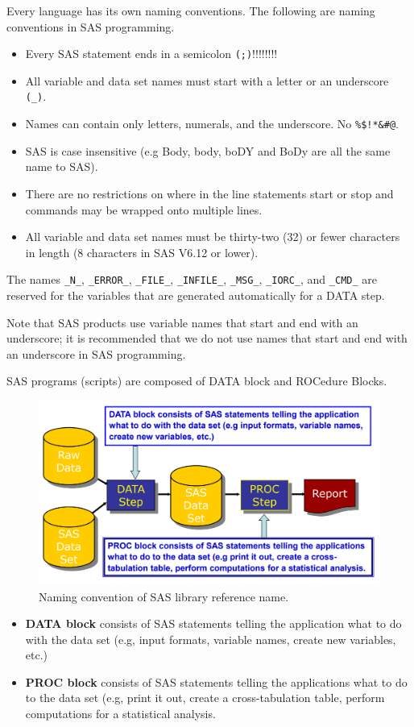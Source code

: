 \documentclass[
]{book}
\providecommand{\tightlist}{%
  \setlength{\itemsep}{0pt}\setlength{\parskip}{0pt}}
\begin{document}
Every language has its own naming conventions. The following are naming conventions in SAS programming.

\begin{itemize}
\tightlist
\item
  Every SAS statement ends in a semicolon \texttt{(;)}!!!!!!!!
\item
  All variable and data set names must start with a letter or an underscore \texttt{(\_)}.
\item
  Names can contain only letters, numerals, and the underscore. No \texttt{\%\$!*\&\#@}.
\item
  SAS is case insensitive (e.g Body, body, boDY and BoDy are all the same name to SAS).
\item
  There are no restrictions on where in the line statements start or stop and commands may be wrapped onto multiple lines.
\item
  All variable and data set names must be thirty-two (32) or fewer characters in length (8 characters in SAS V6.12 or lower).
\end{itemize}

The names \texttt{\_N\_}, \texttt{\_ERROR\_}, \texttt{\_FILE\_}, \texttt{\_INFILE\_}, \texttt{\_MSG\_}, \texttt{\_IORC\_}, and \texttt{\_CMD\_} are reserved for the variables that are generated automatically for a DATA step.

Note that SAS products use variable names that start and end with an underscore; it is recommended that we do not use names that start and end with an underscore in SAS programming.

SAS programs (scripts) are composed of DATA block and ROCedure Blocks.

\begin{figure}

{\centering \includegraphics[width=0.5\linewidth]{img02/w02-SASCodeStructure} 

}

\caption{Naming convention of SAS library reference name.}\label{fig:unnamed-chunk-9}
\end{figure}

\begin{itemize}
\item
  \textbf{DATA block} consists of SAS statements telling the application what to do with the data set (e.g, input formats, variable names, create new variables, etc.)
\item
  \textbf{PROC block} consists of SAS statements telling the applications what to do to the data set (e.g, print it out, create a cross-tabulation table, perform computations for a statistical analysis.
\end{itemize}
\end{document}
